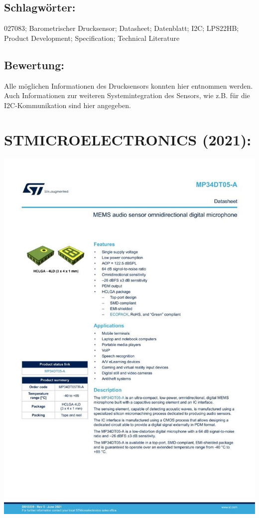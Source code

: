 \subsection*{Schlagwörter:}
027083; Barometrischer Drucksensor; Datasheet; Datenblatt; I2C; LPS22HB; Product Development; Specification; Technical Literature
\subsection*{Bewertung:}
Alle möglichen Informationen des Drucksensors konnten hier entnommen werden. Auch Informationen zur weiteren Systemintegration des Sensors, wie z.B. für die I2C-Kommunikation sind hier angegeben.

\section*{STMICROELECTRONICS (2021):}
\begin{minipage}{0.5\textwidth}
	\includegraphics[width=\linewidth]{../Appendix/Literaturverzeichnis/img/STM3.jpg}
\end{minipage}
